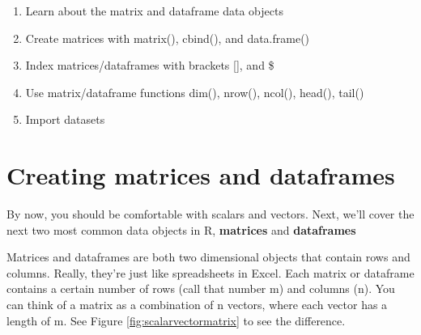\documentclass{tufte-book}\usepackage[]{graphicx}\usepackage[]{color}
\begin{document}
\begin{enumerate}
  \item Learn about the matrix and dataframe data objects
  \item Create matrices with matrix(), cbind(), and data.frame()
  \item Index matrices/dataframes with brackets [], and \$
  \item Use matrix/dataframe functions dim(), nrow(), ncol(), head(), tail()
  \item Import datasets
\end{enumerate}


\section{Creating matrices and dataframes}

By now, you should be comfortable with scalars and vectors. Next, we'll cover the next two most common data objects in R, \textbf{matrices} and \textbf{dataframes}

Matrices and dataframes are both two dimensional objects that contain rows and columns. Really, they're just like spreadsheets in Excel. Each matrix or dataframe contains a certain number of rows (call that number m) and columns (n). You can think of a matrix as a combination of n vectors, where each vector has a length of m. See Figure \ref{fig:scalarvectormatrix} to see the difference.
\end{document}

